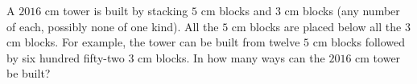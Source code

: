 A $2016$ cm tower is built by stacking $5$ cm blocks and $3$ cm blocks (any number of each, possibly none of one kind). All the $5$ cm blocks are placed below all the $3$ cm blocks. For example, the tower can be built from twelve $5$ cm blocks followed by six hundred fifty-two $3$ cm blocks. In how many ways can the $2016$ cm tower be built?
